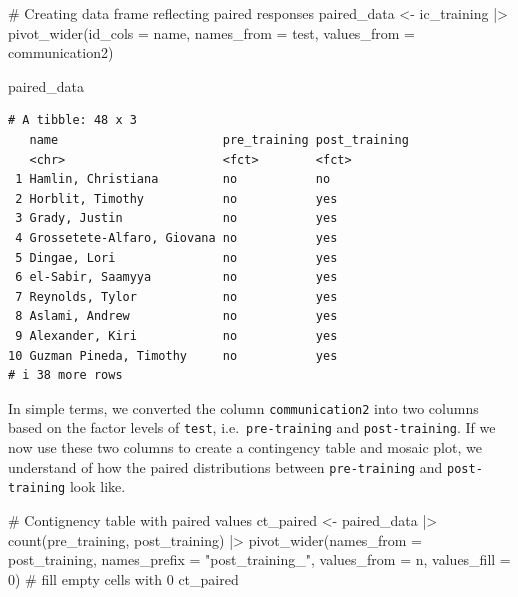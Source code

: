 \documentclass[
  letterpaper,
  DIV=11,
  numbers=noendperiod]{scrreprt}
\newenvironment{Shaded}{\begin{snugshade}}{\end{snugshade}}
\newcommand{\AttributeTok}[1]{\textcolor[rgb]{0.40,0.45,0.13}{#1}}
\newcommand{\CommentTok}[1]{\textcolor[rgb]{0.37,0.37,0.37}{#1}}
\newcommand{\DecValTok}[1]{\textcolor[rgb]{0.68,0.00,0.00}{#1}}
\newcommand{\FunctionTok}[1]{\textcolor[rgb]{0.28,0.35,0.67}{#1}}
\newcommand{\NormalTok}[1]{\textcolor[rgb]{0.00,0.23,0.31}{#1}}
\newcommand{\OtherTok}[1]{\textcolor[rgb]{0.00,0.23,0.31}{#1}}
\newcommand{\SpecialCharTok}[1]{\textcolor[rgb]{0.37,0.37,0.37}{#1}}
\newcommand{\StringTok}[1]{\textcolor[rgb]{0.13,0.47,0.30}{#1}}
\begin{document}
\begin{Shaded}
\begin{Highlighting}[]
\CommentTok{\# Creating data frame reflecting paired responses}
\NormalTok{paired\_data }\OtherTok{\textless{}{-}}
\NormalTok{  ic\_training }\SpecialCharTok{|\textgreater{}}
  \FunctionTok{pivot\_wider}\NormalTok{(}\AttributeTok{id\_cols =}\NormalTok{ name,}
              \AttributeTok{names\_from =}\NormalTok{ test,}
              \AttributeTok{values\_from =}\NormalTok{ communication2)}

\NormalTok{paired\_data}
\end{Highlighting}
\end{Shaded}

\begin{verbatim}
# A tibble: 48 x 3
   name                       pre_training post_training
   <chr>                      <fct>        <fct>        
 1 Hamlin, Christiana         no           no           
 2 Horblit, Timothy           no           yes          
 3 Grady, Justin              no           yes          
 4 Grossetete-Alfaro, Giovana no           yes          
 5 Dingae, Lori               no           yes          
 6 el-Sabir, Saamyya          no           yes          
 7 Reynolds, Tylor            no           yes          
 8 Aslami, Andrew             no           yes          
 9 Alexander, Kiri            no           yes          
10 Guzman Pineda, Timothy     no           yes          
# i 38 more rows
\end{verbatim}

In simple terms, we converted the column \texttt{communication2} into
two columns based on the factor levels of \texttt{test},
i.e.~\texttt{pre-training} and \texttt{post-training}. If we now use
these two columns to create a contingency table and mosaic plot, we
understand of how the paired distributions between \texttt{pre-training}
and \texttt{post-training} look like.

\begin{Shaded}
\begin{Highlighting}[]
\CommentTok{\# Contignency table with paired values}
\NormalTok{ct\_paired }\OtherTok{\textless{}{-}}
\NormalTok{  paired\_data }\SpecialCharTok{|\textgreater{}}
  \FunctionTok{count}\NormalTok{(pre\_training, post\_training) }\SpecialCharTok{|\textgreater{}}
  \FunctionTok{pivot\_wider}\NormalTok{(}\AttributeTok{names\_from =}\NormalTok{ post\_training,}
              \AttributeTok{names\_prefix =} \StringTok{"post\_training\_"}\NormalTok{,}
              \AttributeTok{values\_from =}\NormalTok{ n,}
              \AttributeTok{values\_fill =} \DecValTok{0}\NormalTok{) }\CommentTok{\# fill empty cells with \textquotesingle{}0\textquotesingle{}}
\NormalTok{ct\_paired}
\end{Highlighting}
\end{Shaded}
\end{document}
